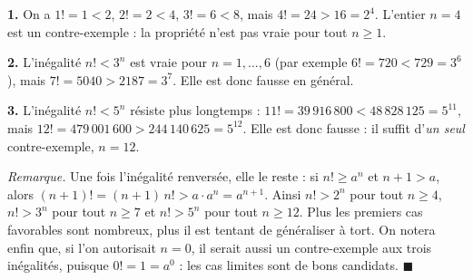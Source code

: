 \textbf{1.} On a $1! = 1 < 2$, $2! = 2 < 4$, $3! = 6 < 8$, mais
$4! = 24 > 16 = 2^4$. L'entier $n = 4$ est un contre-exemple : la propriété
n'est pas vraie pour tout $n \geqslant 1$.

\textbf{2.} L'inégalité $n! < 3^n$ est vraie pour $n = 1, \ldots, 6$
(par exemple $6! = 720 < 729 = 3^6$), mais $7! = 5040 > 2187 = 3^7$.
Elle est donc fausse en général.

\textbf{3.} L'inégalité $n! < 5^n$ résiste plus longtemps :
$11! = 39\,916\,800 < 48\,828\,125 = 5^{11}$, mais
$12! = 479\,001\,600 > 244\,140\,625 = 5^{12}$. Elle est donc fausse : il
suffit d'\emph{un seul} contre-exemple, $n = 12$.

\emph{Remarque.} Une fois l'inégalité renversée, elle le reste : si
$n! \geqslant a^n$ et $n + 1 > a$, alors $(n+1)! = (n+1)\,n! > a \cdot a^n = a^{n+1}$.
Ainsi $n! > 2^n$ pour tout $n \geqslant 4$, $n! > 3^n$ pour tout $n \geqslant 7$
et $n! > 5^n$ pour tout $n \geqslant 12$. Plus les premiers cas favorables
sont nombreux, plus il est tentant de généraliser à tort. On notera enfin que,
si l'on autorisait $n = 0$, il serait aussi un contre-exemple aux trois
inégalités, puisque $0! = 1 = a^0$ : les cas limites sont de bons candidats.
\hfill $\blacksquare$
